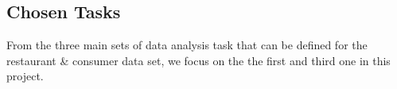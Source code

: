 

\subsection{Chosen Tasks}\label{subsec:chosentasks}
From the three main sets of data analysis task that can be defined for the restaurant \& consumer data set, we focus on the the first and third one in this project.

